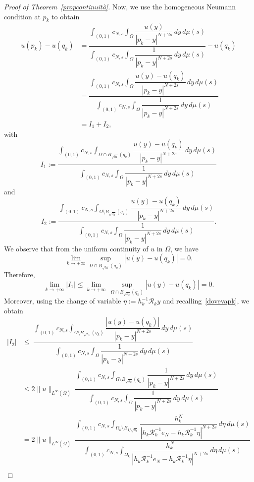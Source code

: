 \documentclass[12pt,a4paper,intlimits,sumlimits]{amsart}
\theoremstyle{definition}
\theoremstyle{plain}
\numberwithin{equation}{section}
\renewcommand{\leq}{\leqslant}
\renewcommand{\le}{\leqslant}
\begin{document}
\begin{proof}[Proof of Theorem~\ref{propcontinuità}]
Now, we use the homogeneous Neumann condition at $p_k$ to obtain
\[
\begin{split}
u(p_k)-u(q_k)&=\dfrac{\displaystyle\int_{(0,1)}c_{N,s}\int_{\Omega}\dfrac{u(y)}{|p_k-y|^{N+2s}}\,dy\,d\mu(s)}{\displaystyle\int_{(0,1)}c_{N,s}\int_{\Omega}\dfrac{1}{|p_k-y|^{N+2s}}\,dy\,d\mu(s)}-u(q_k)\\
&=\dfrac{\displaystyle\int_{(0,1)}c_{N,s}\int_{\Omega}\dfrac{u(y)-u(q_k)}{|p_k-y|^{N+2s}}\,dy\,d\mu(s)}{\displaystyle\int_{(0,1)}c_{N,s}\int_{\Omega}\dfrac{1}{|p_k-y|^{N+2s}}\,dy\,d\mu(s)}\\
&=I_1+I_2,
\end{split}
\]
with 
\[
I_1:=\dfrac{\displaystyle\int_{(0,1)}c_{N,s}\int_{\Omega\cap B_{\sqrt{h_k}}(q_k)}\dfrac{u(y)-u(q_k)}{|p_k-y|^{N+2s}}\,dy\,d\mu(s)}{\displaystyle\int_{(0,1)}c_{N,s}\int_{\Omega}\dfrac{1}{|p_k-y|^{N+2s}}\,dy\,d\mu(s)}
\]
and
\begin{equation}\label{I2}
I_2:=\dfrac{\displaystyle\int_{(0,1)}c_{N,s}\int_{\Omega\setminus B_{\sqrt{h_k}}(q_k)}\dfrac{u(y)-u(q_k)}{|p_k-y|^{N+2s}}\,dy\,d\mu(s)}{\displaystyle\int_{(0,1)}c_{N,s}\int_{\Omega}\dfrac{1}{|p_k-y|^{N+2s}}\,dy\,d\mu(s)}.
\end{equation}
We observe that from the uniform continuity of $u$ in $\Omega$, we
have
\[
\lim_{k\to +\infty}\sup_{\Omega\cap B_{\sqrt{h_k}}(q_k)}
|u(y)-u(q_k)|=0.
\]
Therefore,
\begin{equation}\label{I1to0}
\lim_{k\to +\infty} |I_1|\le\lim_{k\to +\infty} \, \sup_{\Omega\cap B_{\sqrt{h_k}}(q_k)} |u(y)-u(q_k)|= 0.
\end{equation}
Moreover, using the change of variable 
$\eta:=h_k^{-1}\mathcal{R}_k y$ and recalling~\eqref{dovevapk},
we obtain
\[
\begin{aligned}
|I_2|&\leq \ \dfrac{\displaystyle\int_{(0,1)}c_{N,s}\int_{\Omega\setminus B_{\sqrt{h_k}}(q_k)}\dfrac{|u(y)-u(q_k)|}{|p_k-y|^{N+2s}}\,dy\,d\mu(s)}{\displaystyle\int_{(0,1)}c_{N,s}\int_{\Omega}\dfrac{1}{|p_k-y|^{N+2s}}\,dy\,d\mu(s)}\\
&\leq 2\|u\|_{L^\infty(\overline{\Omega})} \ \dfrac{\displaystyle\int_{(0,1)}c_{N,s}\int_{\Omega\setminus B_{\sqrt{h_k}}(q_k)}\dfrac{1}{|p_k-y|^{N+2s}}\,dy\,d\mu(s)}{\displaystyle\int_{(0,1)}c_{N,s}\int_{\Omega}\dfrac{1}{|p_k-y|^{N+2s}}\,dy\,d\mu(s)} \\
&=2\|u\|_{L^\infty(\overline{\Omega})} \ \dfrac{\displaystyle\int_{(0,1)}c_{N,s}\int_{\Omega_k\setminus B_{1/{\sqrt{h_k}}}}\dfrac{h_k^N}{|h_k\mathcal{R}_k^{-1}e_N-h_k\mathcal{R}_k^{-1}\eta|^{N+2s}}\,d\eta\,d\mu(s)}{\displaystyle\int_{(0,1)}c_{N,s}\int_{\Omega_k}\dfrac{h_k^N}{|h_k\mathcal{R}_k^{-1}e_N-h_k\mathcal{R}_k^{-1}\eta|^{N+2s}}\,d\eta\,d\mu(s)} \\

\end{aligned}\]
\end{proof}
\end{document}
